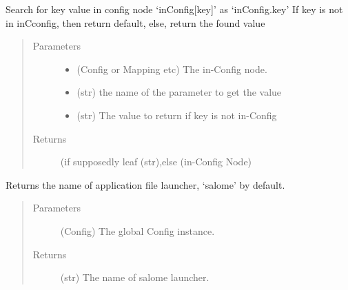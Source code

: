 \documentclass[a4paper,10pt,english]{sphinxmanual}
\begin{document}
\begin{fulllineitems}
\label{\detokenize{apidoc_src/src:src.utilsSat.get_config_key}}
Search for key value in config node ‘inConfig{[}key{]}’ as ‘inConfig.key’
If key is not in inCconfig, then return default,
else, return the found value
\begin{quote}\begin{description}
\item[{Parameters}] \leavevmode\begin{itemize}
\item {} 
 \textendash{} (Config or Mapping etc) The in-Config node.

\item {} 
 \textendash{} (str) the name of the parameter to get the value

\item {} 
 \textendash{} (str) The value to return if key is not in-Config

\end{itemize}

\item[{Returns}] \leavevmode
(if supposedly leaf (str),else (in-Config Node)

\end{description}\end{quote}

\end{fulllineitems}


\begin{fulllineitems}
\label{\detokenize{apidoc_src/src:src.utilsSat.get_launcher_name}}
Returns the name of application file launcher, ‘salome’ by default.
\begin{quote}\begin{description}
\item[{Parameters}] \leavevmode
{} \textendash{} (Config) The global Config instance.

\item[{Returns}] \leavevmode
(str) The name of salome launcher.

\end{description}\end{quote}

\end{fulllineitems}
\end{document}
